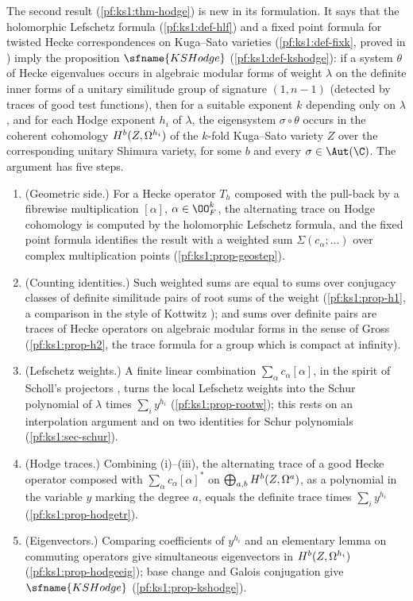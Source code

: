 The second result (\cref{pf:ks1:thm-hodge}) is new in its formulation. It says that the
holomorphic Lefschetz formula (\cref{pf:ks1:def-hlf}) and a fixed point formula for twisted Hecke
correspondences on Kuga--Sato varieties (\cref{pf:ks1:def-fixk}, proved in
) imply the proposition $\sfname{KSHodge}$
(\cref{pf:ks1:def-kshodge}): if a system $\theta$ of Hecke eigenvalues occurs in algebraic modular
forms of weight $\lambda$ on the definite inner forms of a unitary similitude group of signature
$(1,n-1)$ (detected by traces of good test functions), then for a suitable exponent $k$ depending
only on $\lambda$, and for each Hodge exponent $h_i$ of $\lambda$, the eigensystem $\sigma\circ\theta$
occurs in the coherent cohomology $\ksoneH{Z}{h_i}{b}$ of the $k$-fold Kuga--Sato variety $Z$ over the
corresponding unitary Shimura variety, for some $b$ and every $\sigma\in\Aut(\C)$. The argument has five
steps.
\begin{enumerate}[label=(\roman*)]
\item (Geometric side.) For a Hecke operator $T_h$ composed with the pull-back by a fibrewise
  multiplication $[\alpha]$, $\alpha\in\OO_F^k$, the alternating trace on Hodge cohomology is computed by
  the holomorphic Lefschetz formula, and the fixed point formula identifies the result with a weighted
  sum $\Sigma(c_\alpha;\dots)$ over complex multiplication points (\cref{pf:ks1:prop-geostep}).
\item (Counting identities.) Such weighted sums are equal to sums over conjugacy classes of definite
  similitude pairs of root sums of the weight (\cref{pf:ks1:prop-h1}, a comparison in the style of
  Kottwitz \cite{Kottwitz1992}); and sums over definite pairs are traces of Hecke operators on algebraic
  modular forms in the sense of Gross \cite{Gross1999} (\cref{pf:ks1:prop-h2}, the trace formula for a group
  which is compact at infinity).
\item (Lefschetz weights.) A finite linear combination $\sum_\alpha c_\alpha[\alpha]$, in the spirit of
  Scholl's projectors \cite{Scholl1990}, turns the local Lefschetz weights into the Schur polynomial of
  $\lambda$ times $\sum_iy^{h_i}$ (\cref{pf:ks1:prop-rootw}); this rests on an interpolation
  argument and on two identities for Schur polynomials (\cref{pf:ks1:sec-schur}).
\item (Hodge traces.) Combining (i)--(iii), the alternating trace of a good Hecke operator composed with
  $\sum_\alpha c_\alpha[\alpha]^*$ on $\bigoplus_{a,b}\ksoneH{Z}{a}{b}$, as a polynomial in the
  variable $y$ marking the degree $a$, equals the definite trace times $\sum_iy^{h_i}$
  (\cref{pf:ks1:prop-hodgetr}).
\item (Eigenvectors.) Comparing coefficients of $y^{h_i}$ and an elementary lemma on commuting operators give
  simultaneous eigenvectors in $\ksoneH{Z}{h_i}{b}$ (\cref{pf:ks1:prop-hodgeeig}); base change and Galois
  conjugation give $\sfname{KSHodge}$ (\cref{pf:ks1:prop-kshodge}).
\end{enumerate}

